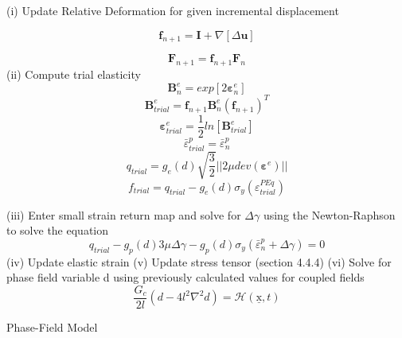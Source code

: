 \documentclass[sn-mathphys,Numbered,draft]{sn-jnl}%
\begin{document}
\begin{algorithm}[H]
\SetAlgoLined
(i) Update Relative Deformation for given incremental displacement

\begin{equation}
  \mathbf{f}_{n+1}=\mathbf{I}+\nabla\left[\Delta\textbf{u}\right]\nonumber
\end{equation}

\begin{equation}
\mathbf{F}_{n+1}=\mathbf{f}_{n+1}\mathbf{F}_n\nonumber
\end{equation}
(ii) Compute trial elasticity
\begin{equation}
\mathbf{B}^{e}_{n}=exp\left[{2\boldsymbol{\varepsilon}^{e}_{n}}\right]\nonumber
\end{equation}
\begin{equation}
\mathbf{B}^{e}_{trial}=\mathbf{f}_{n+1}\mathbf{B}^{e}_{n}(\mathbf{f}_{n+1})^{T}\nonumber
\end{equation}
\begin{equation}
\boldsymbol{\varepsilon}^{e}_{trial}=\frac{1}{2}ln[\textbf{B}^{e}_{trial}]\nonumber
\end{equation}
\begin{equation}
\bar{\varepsilon}^{p}_{trial}=\bar{\varepsilon}^{p}_{n}\nonumber
\end{equation}
\begin{equation}
{q}_{trial}=g_e(d)\sqrt{\frac{3}{2}}\lvert\lvert2\mu dev(\boldsymbol{\varepsilon}^e)\rvert\rvert\nonumber
\end{equation}
\begin{equation}
f_{trial}={q}_{trial}-g_e(d)\sigma_{y}(\varepsilon^{PEq}_{trial}) \nonumber 
\end{equation}

(iii) Enter small strain return map and solve for $\Delta\gamma$ using the Newton-Raphson to solve the equation
\begin{equation}
{q}_{trial}-g_p(d)3\mu\Delta\gamma-g_p(d)\sigma_{y}(\bar{\varepsilon}^{p}_{n}+\Delta\gamma)=0\nonumber
\end{equation}
(iv) Update elastic strain
(v) Update stress tensor (section 4.4.4)
(vi) Solve for phase field variable d using previously calculated values for coupled fields
\begin{equation}
	\frac{G_c}{2l}\left(d-4l^2\nabla^2d\right)=\mathcal{H}\left(\underline{\mathrm{x}},t\right)	
	\end{equation}
\caption{Phase-Field Model}
\end{algorithm}
\end{document}
